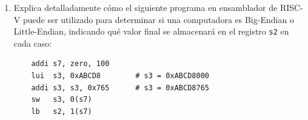 \documentclass[letterpaper,12pt]{article}
\begin{document}
\begin{enumerate}
\begin{enumerate}[label=\alph*)]
        \item Extracción de valores inmediatos:
        \begin{itemize}
            \item \textbf{Para \texttt{addi s3, s4, 28}:}
            \begin{itemize}[noitemsep]
                \item Decimal: \texttt{28}
                \item Binario (12 bits): \texttt{000000011100}
            \end{itemize}
            \item \textbf{Para \texttt{srli s3, s1, 14}:}
            \begin{itemize}[noitemsep]
                \item Decimal: \texttt{14}
                \item Binario (12 bits): En el formato Tipo I para desplazamientos inmediatos, los 7 bits más significativos corresponden al opcode extendido (\texttt{imm[11:5] = 0000000}) y los 5 bits menos significativos definen el corrimiento (\texttt{imm[4:0] = 01110}). Concatenados como inmediato: \texttt{000000001110}.
            \end{itemize}
            \item \textbf{Para \texttt{sw s9, 16(t4)}:}
            \begin{itemize}[noitemsep]
                \item Decimal: \texttt{16}
                \item Binario (12 bits): \texttt{000000010000}. Físicamente en la instrucción se divide en \texttt{imm[11:5] = 0000000} y \texttt{imm[4:0] = 10000}.
            \end{itemize}
        \end{itemize}
    \end{enumerate}
    \color{black}

    \vspace{0.5cm}

    \item Explica detalladamente cómo el siguiente programa en ensamblador de RISC-V puede ser utilizado para determinar si una computadora es Big-Endian o Little-Endian, indicando qué valor final se almacenará en el registro \texttt{s2} en cada caso:
    \begin{verbatim}
    addi s7, zero, 100
    lui  s3, 0xABCD8        # s3 = 0xABCD8000
    addi s3, s3, 0x765      # s3 = 0xABCD8765
    sw   s3, 0(s7)
    lb   s2, 1(s7)
    \end{verbatim}


\end{enumerate}
\end{document}
